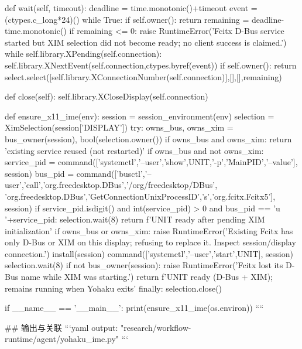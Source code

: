     def wait(self, timeout):
        deadline = time.monotonic()+timeout
        event = (ctypes.c_long*24)()
        while True:
            if self.owner():
                return
            remaining = deadline-time.monotonic()
            if remaining <= 0:
                raise RuntimeError('Fcitx D-Bus service started but XIM selection did not become ready; no client success is claimed.')
            while self.library.XPending(self.connection):
                self.library.XNextEvent(self.connection,ctypes.byref(event))
            if self.owner():
                return
            select.select([self.library.XConnectionNumber(self.connection)],[],[],remaining)

    def close(self):
        self.library.XCloseDisplay(self.connection)


def ensure_x11_ime(env):
    session = session_environment(env)
    selection = XimSelection(session['DISPLAY'])
    try:
        owns_bus, owns_xim = bus_owner(session), bool(selection.owner())
        if owns_bus and owns_xim:
            return 'existing service reused (not restarted)'
        if owns_bus and not owns_xim:
            service_pid = command(['systemctl','--user','show',UNIT,'-p','MainPID','--value'], session)
            bus_pid = command(['busctl','--user','call','org.freedesktop.DBus','/org/freedesktop/DBus',
                               'org.freedesktop.DBus','GetConnectionUnixProcessID','s','org.fcitx.Fcitx5'], session)
            if service_pid.isdigit() and int(service_pid) > 0 and bus_pid == 'u '+service_pid:
                selection.wait(8)
                return f'{UNIT} ready after pending XIM initialization'
        if owns_bus or owns_xim:
            raise RuntimeError('Existing Fcitx has only D-Bus or XIM on this display; refusing to replace it. Inspect session/display connection.')
        install(session)
        command(['systemctl','--user','start',UNIT], session)
        selection.wait(8)
        if not bus_owner(session):
            raise RuntimeError('Fcitx lost its D-Bus name while XIM was starting.')
        return f'{UNIT} ready (D-Bus + XIM); remains running when Yohaku exits'
    finally:
        selection.close()


if __name__ == '__main__':
    print(ensure_x11_ime(os.environ))
````

## 输出与关联
```yaml
output: "research/workflow-runtime/agent/yohaku_ime.py"
```
